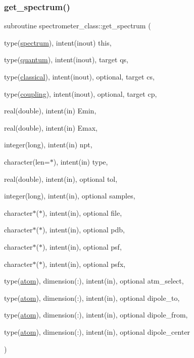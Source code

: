 \subsubsection{\texorpdfstring{get\+\_\+spectrum()}{get\_spectrum()}}
{\footnotesize\ttfamily subroutine spectrometer\+\_\+class\+::get\+\_\+spectrum (\begin{DoxyParamCaption}\item[{type(\hyperlink{structspectrometer__class_1_1spectrum}{spectrum}), intent(inout)}]{this,  }\item[{type(\hyperlink{structquantum__class_1_1quantum}{quantum}), intent(inout), target}]{qs,  }\item[{type(\hyperlink{structclassical__class_1_1classical}{classical}), intent(inout), optional, target}]{cs,  }\item[{type(\hyperlink{structcoupling__class_1_1coupling}{coupling}), intent(inout), optional, target}]{cp,  }\item[{real(double), intent(in)}]{Emin,  }\item[{real(double), intent(in)}]{Emax,  }\item[{integer(long), intent(in)}]{npt,  }\item[{character(len=$\ast$), intent(in)}]{type,  }\item[{real(double), intent(in), optional}]{tol,  }\item[{integer(long), intent(in), optional}]{samples,  }\item[{character$\ast$($\ast$), intent(in), optional}]{file,  }\item[{character$\ast$($\ast$), intent(in), optional}]{pdb,  }\item[{character$\ast$($\ast$), intent(in), optional}]{psf,  }\item[{character$\ast$($\ast$), intent(in), optional}]{psfx,  }\item[{type(\hyperlink{structmolreader_1_1atom}{atom}), dimension(\+:), intent(in), optional}]{atm\+\_\+select,  }\item[{type(\hyperlink{structmolreader_1_1atom}{atom}), dimension(\+:), intent(in), optional}]{dipole\+\_\+to,  }\item[{type(\hyperlink{structmolreader_1_1atom}{atom}), dimension(\+:), intent(in), optional}]{dipole\+\_\+from,  }\item[{type(\hyperlink{structmolreader_1_1atom}{atom}), dimension(\+:), intent(in), optional}]{dipole\+\_\+center }\end{DoxyParamCaption})\hspace{0.3cm}{\ttfamily [private]}}



